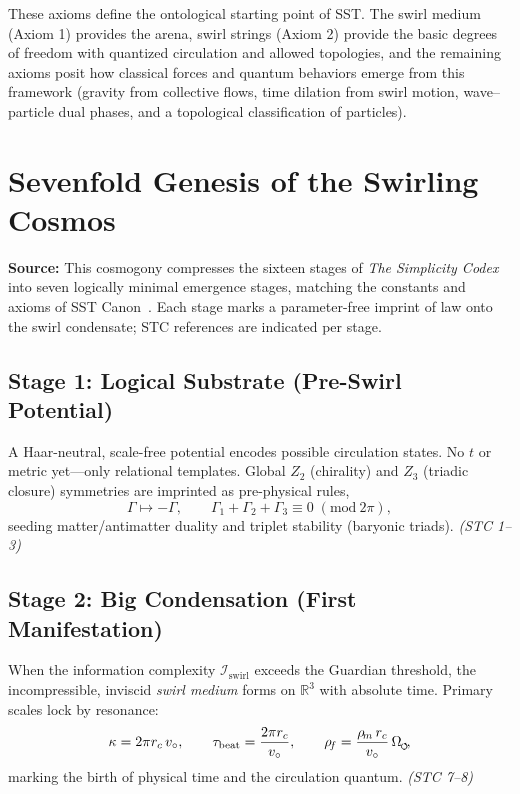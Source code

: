 \documentclass[reprint,aps,onecolumn,nofootinbib]{revtex4-2}
\newcommand{\swirlarrow}{%
    \mathchoice{\mkern-2mu\scriptstyle\boldsymbol{\circlearrowleft}}%
    {\mkern-2mu\scriptstyle\boldsymbol{\circlearrowleft}}%
    {\mkern-2mu\scriptscriptstyle\boldsymbol{\circlearrowleft}}%
    {\mkern-2mu\scriptscriptstyle\boldsymbol{\circlearrowleft}}%
}
\newcommand{\rhof}{\rho_{\!f}}                           %
\newcommand{\rhom}{\rho_{\!m}}                           %
\newcommand{\rc}{r_c}                                    %
\begin{document}
	These axioms define the ontological starting point of SST. The swirl medium (Axiom 1) provides the arena, swirl strings (Axiom 2) provide the basic degrees of freedom with quantized circulation and allowed topologies, and the remaining axioms posit how classical forces and quantum behaviors emerge from this framework (gravity from collective flows, time dilation from swirl motion, wave–particle dual phases, and a topological classification of particles).


	\section{Sevenfold Genesis of the Swirling Cosmos}\label{sec:cosmogony-seven}

	\noindent

	\begin{tcolorbox}[title=Canonical Scope]
		\textbf{Source:} This cosmogony compresses the sixteen stages of
		\emph{The Simplicity Codex} \cite{Goldau2025_STC}
		into seven logically minimal emergence stages, matching the constants
		and axioms of SST Canon~\canonversion. Each stage marks a parameter-free imprint of law onto the swirl condensate; STC references are indicated per stage.
	\end{tcolorbox}

	\subsection*{Stage 1: Logical Substrate (Pre-Swirl Potential)}
	A Haar-neutral, scale-free potential encodes possible circulation states. No $t$ or metric yet—only relational templates. Global $Z_2$ (chirality) and $Z_3$ (triadic closure) symmetries are imprinted as pre-physical rules,
	\[
		\Gamma \mapsto -\Gamma,
		\qquad
		\Gamma_1+\Gamma_2+\Gamma_3\equiv 0 \;(\mathrm{mod}\ 2\pi),
	\]
	seeding matter/antimatter duality and triplet stability (baryonic triads).
	\emph{(STC 1–3)}

	\subsection*{Stage 2: Big Condensation (First Manifestation)}
	When the information complexity $\mathcal{I}_{\mathrm{swirl}}$ exceeds the Guardian threshold, the incompressible, inviscid \emph{swirl medium} forms on $\mathbb{R}^3$ with absolute time. Primary scales lock by resonance:
	\[
		\kappa = 2\pi \rc \, v_{\circ},\qquad
		\tau_{\mathrm{beat}}=\frac{2\pi \rc}{v_{\circ}},\qquad
		\rhof = \frac{\rhom\,\rc}{v_{\circ}}\,\Omega_{\swirlarrow}\!,
	\]
	marking the birth of physical time and the circulation quantum.
	\emph{(STC 7–8)}
\end{document}
